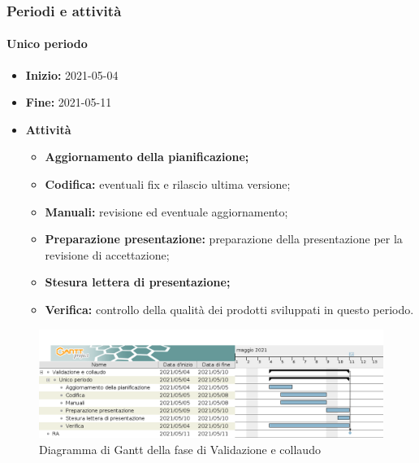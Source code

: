 \subsubsection{Periodi e attività}

\paragraph[Unico periodo]{Unico periodo}
\begin{itemize}
    \item [] \textbf{Inizio:} 2021-05-04
    \item [] \textbf{Fine:} 2021-05-11
    \item [] \textbf{Attività}
          \begin{itemize}
              \item \textbf{Aggiornamento della pianificazione;}
              \item \textbf{Codifica:} eventuali fix e rilascio ultima versione;
              \item \textbf{Manuali:} revisione ed eventuale aggiornamento;
              \item \textbf{Preparazione presentazione:} preparazione della presentazione per la revisione di accettazione;
              \item \textbf{Stesura lettera di presentazione;}
              \item \textbf{Verifica:} controllo della qualità dei prodotti sviluppati in questo periodo.
          \end{itemize}
\end{itemize}

\begin{figure}[H]
    \centering
    \includegraphics[width=1\linewidth]{res/images/pianificazione/validazione_e_collaudo.png}
    \caption{Diagramma di Gantt della fase di Validazione e collaudo}
    \label{fig:_Gantt Validazione e collaudo}
\end{figure}

